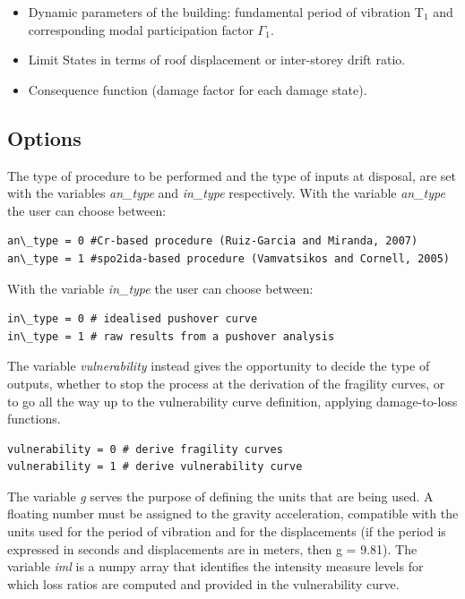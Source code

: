\begin{itemize}
\item Dynamic parameters of the building: fundamental period of vibration T$_1$ and corresponding modal participation factor $\Gamma_1$.
\item Limit States in terms of roof displacement or inter-storey drift ratio.
\item Consequence function (damage factor for each damage state).
\end{itemize}

\subsection{Options}
\label{sub:options}
The type of procedure to be performed and the type of inputs at disposal, are set with the variables \textit{an\_type} and \textit{in\_type} respectively. With the variable \textit{an\_type} the user can choose between:

\begin{Verbatim}[frame=single, commandchars=\\\{\}, samepage=true]
an\_type = 0 #Cr-based procedure (Ruiz-Garcia and Miranda, 2007)
an\_type = 1 #spo2ida-based procedure (Vamvatsikos and Cornell, 2005)
\end{Verbatim}

With the variable \textit{in\_type} the user can choose between:

\begin{Verbatim}[frame=single, commandchars=\\\{\}, samepage=true]
in\_type = 0 # idealised pushover curve
in\_type = 1 # raw results from a pushover analysis
\end{Verbatim}

The variable \textit{vulnerability} instead gives the opportunity to decide the type of outputs, whether to stop the process at the derivation of the fragility curves, or to go all the way up to the vulnerability curve definition, applying damage-to-loss functions.

\begin{Verbatim}[frame=single, commandchars=\\\{\}, samepage=true]
vulnerability = 0 # derive fragility curves 
vulnerability = 1 # derive vulnerability curve
\end{Verbatim}

The variable \textit{g} serves the purpose of defining the units that are being used. A floating number must be assigned to the gravity acceleration, compatible with the units used for the period of vibration and for the displacements (if the period is expressed in seconds and displacements are in meters, then g = 9.81). The variable \textit{iml} is a numpy array that identifies the intensity measure levels for which loss ratios are computed and provided in the vulnerability curve.

